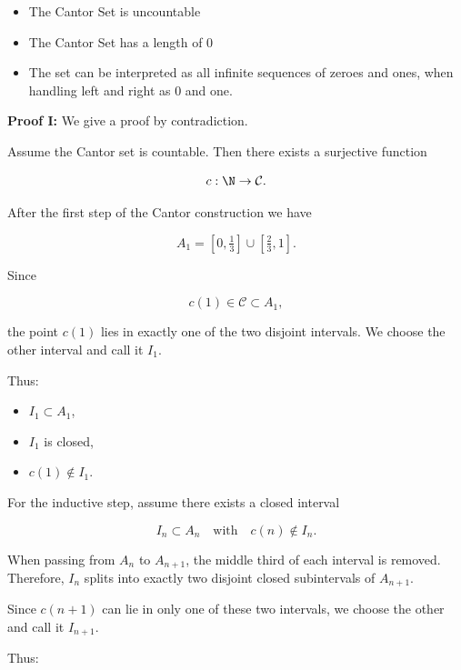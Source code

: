 \begin{itemize}

	\item The Cantor Set is uncountable 
	
	\item The Cantor Set has a length of 0 
	
	\item The set can be interpreted as all infinite sequences of zeroes and ones, when handling left and right as 0 and one.

\end{itemize}

\textbf{Proof I:}
We give a proof by contradiction.

Assume the Cantor set is countable. Then there exists a surjective function

\[
	c : \N \to \mathcal{C}.
\]

After the first step of the Cantor construction we have

\[
	A_{1} = [0,\tfrac{1}{3}] \cup [\tfrac{2}{3}, 1].
\]

Since

\[
	c(1) \in \mathcal{C} \subset A_{1},
\]

the point \(c(1)\) lies in exactly one of the two disjoint intervals.  
We choose the other interval and call it \(I_{1}\).

Thus:

\begin{itemize}

	\item \(I_{1} \subset A_{1}\),

	\item \(I_{1}\) is closed,

	\item \(c(1) \notin I_{1}\).

\end{itemize}


For the inductive step, assume there exists a closed interval

\[
	I_{n} \subset A_{n} \quad \text{with} \quad c(n) \notin I_{n}.
\]

When passing from \(A_{n}\) to \(A_{n+1}\), the middle third of each interval is removed.
Therefore, \(I_{n}\) splits into exactly two disjoint closed subintervals of \(A_{n+1}\).

Since \(c(n+1)\) can lie in only one of these two intervals, we choose the other and call it \(I_{n+1}\).

Thus:

